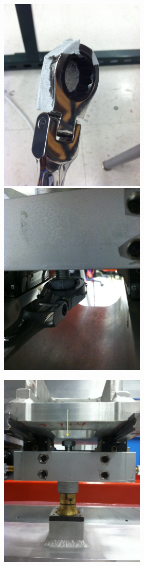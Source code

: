 \documentclass[11pt]{article}
\begin{document}
\begin{figure}[h]
\begin{center}
\includegraphics[width = 2.75in]{photoAlign1.JPG}
\includegraphics[width = 2.75in]{photoAlignTwo.JPG}
\caption{}  
\label{figAlign}
\end{center}
\end{figure}

\begin{figure}[h]
\begin{center}
\includegraphics[width = 2.75in]{screwWarning.JPG}
\caption{}  
\label{figAlign2}
\end{center}
\end{figure}
\end{document}
